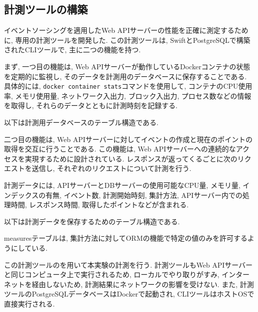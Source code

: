 \documentclass[../../../main]{subfiles}
\begin{document}
    \subsection{計測ツールの構築}\label{subsec:method-measurement_tool}

    イベントソーシングを適用したWeb APIサーバーの性能を正確に測定するために, 専用の計測ツールを開発した. この計測ツールは, SwiftとPostgreSQLで構築されたCLIツールで, 主に二つの機能を持つ.

    まず, 一つ目の機能は, Web APIサーバーが動作しているDockerコンテナの状態を定期的に監視し, そのデータを計測用のデータベースに保存することである. 具体的には, \texttt{docker container stats}コマンドを使用して, コンテナのCPU使用率, メモリ使用量, ネットワーク入出力, ブロック入出力, プロセス数などの情報を取得し, それらのデータとともに計測時刻を記録する.

    以下は計測用データベースのテーブル構造である.

    

    二つ目の機能は, Web APIサーバーに対してイベントの作成と現在のポイントの取得を交互に行うことである. この機能は, Web APIサーバーへの連続的なアクセスを実現するために設計されている. レスポンスが返ってくるごとに次のリクエストを送信し, それぞれのリクエストについて計測を行う.

    計測データには, APIサーバーとDBサーバーの使用可能なCPU量, メモリ量, インデックスの有無, イベント数, 計測開始時刻, 集計方法, APIサーバー内での処理時間, レスポンス時間, 取得したポイントなどが含まれる.

    以下は計測データを保存するためのテーブル構造である.

    

    measuresテーブルは, 集計方法に対してORMの機能で特定の値のみを許可するようにしている.

    この計測ツールのを用いて本実験の計測を行う. 計測ツールもWeb APIサーバーと同じコンピュータ上で実行されるため, ローカルでやり取りがすみ, インターネットを経由しないため, 計測結果にネットワークの影響を受けない. また, 計測ツールのPostgreSQLデータベースはDockerで起動され, CLIツールはホストOSで直接実行される.
\end{document}
